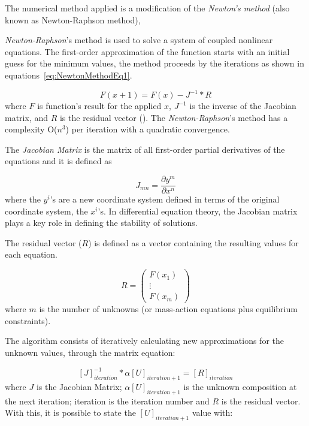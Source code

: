 The numerical method applied is a modification of the \emph{Newton's method} (also known as Newton-Raphson method), 



\emph{Newton-Raphson}'s method is used to solve a system of coupled nonlinear equations. The first-order approximation of the function starts with an initial guess for the minimum values, the method proceeds by the iterations as shown in equations~\ref{eq:NewtonMethodEq1}.

\begin{equation}
\label{eq:NewtonMethodEq1}
F(x+1) = F(x) - J^{-1} * R
\end{equation}
where $F$ is function's result for the applied $x$, $J^{-1}$ is the inverse of the Jacobian matrix, and $R$ is the residual vector (\cite{Isaacson:66}). The \emph{Newton-Raphson}'s method has a complexity O($n^3$) per iteration with a quadratic convergence.


The \emph{Jacobian Matrix} is the matrix of all first-order partial derivatives of the equations and it is defined as

\begin{equation}
\label{eq:JacobianDefinition}
J_{mn} = \frac{\partial y^m}{\partial x^n}
\end{equation}
where the $y^i$'s are a new coordinate system defined in terms of the original coordinate system, the $x^i$'s. In differential equation theory, the Jacobian matrix plays a key role in defining the stability of solutions. 


The residual vector ($R$) is defined as a vector containing the resulting values for each equation.

\begin{equation}
\label{eq:residualVector}
R = \begin{pmatrix}
 F(x_1) \\
 \vdots \\
 F(x_m)
 \end{pmatrix}
\end{equation}
where $m$ is the number of unknowns (or mass-action equations plus equilibrium constraints).


The algorithm consists of iteratively calculating new approximations for the unknown values, through the matrix equation:

\begin{equation}
\label{eq:iterativelyAlgorithm}
[J]^{-1}_{iteration}* \alpha [U]_{iteration+1} = [R]_{iteration}
\end{equation}
where $J$ is the Jacobian Matrix; $ \alpha [U]_{iteration+1} $ is the unknown composition at the next iteration; iteration is the iteration number and $R$ is the residual vector. With this, it is possible to state the $[U]_{iteration+1}$ value with:

